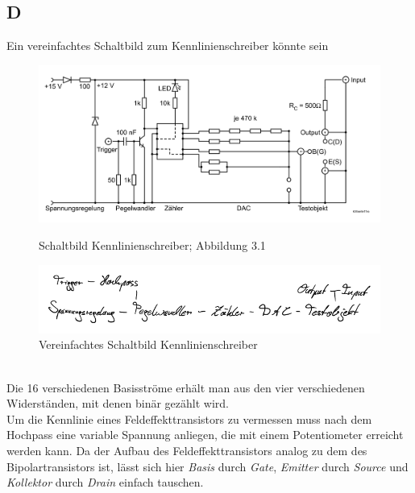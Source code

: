 \documentclass[a4paper,12pt]{article}
\numberwithin{equation}{section}
\begin{document}
\subsection{D}
Ein vereinfachtes Schaltbild zum Kennlinienschreiber könnte sein
\begin{figure}[h]
        \begin{minipage}{0.5\textwidth}
                \centering
                \includegraphics[width=\textwidth]{kennlinienschreiber.png}
                \caption{Schaltbild Kennlinienschreiber; Abbildung 3.1 \cite{Praktikumsanleitung}}
        \end{minipage}
        \begin{minipage}{0.5\textwidth}
                \centering
                \includegraphics[width=\textwidth]{D_crop.pdf}
                \caption{Vereinfachtes Schaltbild Kennlinienschreiber}
        \end{minipage}
\end{figure}\\
Die 16 verschiedenen Basisströme erhält man aus den vier verschiedenen Widerständen, mit denen binär gezählt wird.
\\\indent Um die Kennlinie eines Feldeffekttransistors zu vermessen muss nach dem Hochpass eine variable Spannung anliegen, die mit einem Potentiometer erreicht werden kann.
Da der Aufbau des Feldeffekttransistors analog zu dem des Bipolartransistors ist, lässt sich hier \textit{Basis} durch \textit{Gate}, \textit{Emitter} durch \textit{Source} und \textit{Kollektor} durch \textit{Drain} einfach tauschen.
\end{document}

